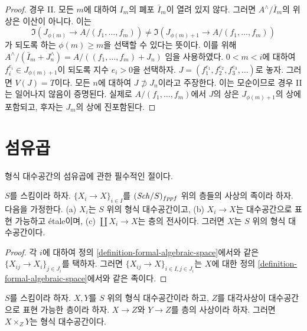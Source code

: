 \begin{proof}
\medskip\noindent
경우 II. 모든 $m$에 대하여 $I_m$의 폐포 $\bar I_m$이 열려 있지
않다. 그러면 $A^\wedge/\bar I_m$의 위상은 이산이 아니다. 이는
$$
\Im(J_{\phi(m)} \to A/(f_1, \ldots, f_m)) \not =
\Im(J_{\phi(m) + 1} \to A/(f_1, \ldots, f_m))
$$
가 되도록 하는 $\phi(m) \geq m$을 선택할 수 있다는 뜻이다.
이를 위해
$A^\wedge/(\bar I_m + J_n^\wedge) = A/((f_1, \ldots, f_m) + J_n)$
임을 사용하였다. $0 < m < i$에 대하여
$f_i^{e_i} \in J_{\phi(m) + 1}$이 되도록 지수 $e_i > 0$을
선택하자. $J = (f_1^{e_1}, f_2^{e_2}, f_3^{e_3}, \ldots)$로
놓자. 그러면 $V(J) = T$이다. 모든 $n$에 대하여
$J \not \supset J_n$이라고 주장한다. 이는 모순이므로 경우 II는
일어나지 않음이 증명된다. 실제로
$A/(f_1, \ldots, f_m)$에서 $J$의 상은
$J_{\phi(m) + 1}$의 상에 포함되고, 후자는 $J_m$의 상에 진포함된다.
\end{proof}

\section{섬유곱}
\label{section-fibre-products}

\noindent
형식 대수공간의 섬유곱에 관한 필수적인 절이다.

\begin{lemma}
\label{lemma-etale-covering-by-formal-algebraic-spaces}
$S$를 스킴이라 하자. $\{X_i \to X\}_{i \in I}$를
$(\mathit{Sch}/S)_{fppf}$ 위의 층들의 사상의 족이라 하자. 다음을 가정한다.
(a) $X_i$는 $S$ 위의 형식 대수공간이고, (b) $X_i \to X$는
대수공간으로 표현 가능하고 \'etale이며, (c) $\coprod X_i \to X$는
층의 전사이다. 그러면 $X$는 $S$ 위의 형식 대수공간이다.
\end{lemma}

\begin{proof}
각 $i$에 대하여 정의 \ref{definition-formal-algebraic-space}에서와 같은
$\{X_{ij} \to X_i\}_{j \in J_i}$를 택하자. 그러면
$\{X_{ij} \to X\}_{i \in I, j \in J_i}$는 $X$에 대한 정의
\ref{definition-formal-algebraic-space}에서와 같은 족이다.
\end{proof}

\begin{lemma}
\label{lemma-fibre-products-general}
$S$를 스킴이라 하자. $X, Y$를 $S$ 위의 형식 대수공간이라 하고,
$Z$를 대각사상이 대수공간으로 표현 가능한 층이라 하자.
$X \to Z$와 $Y \to Z$를 층의 사상이라 하자.
그러면 $X \times_Z Y$는 형식 대수공간이다.
\end{lemma}

